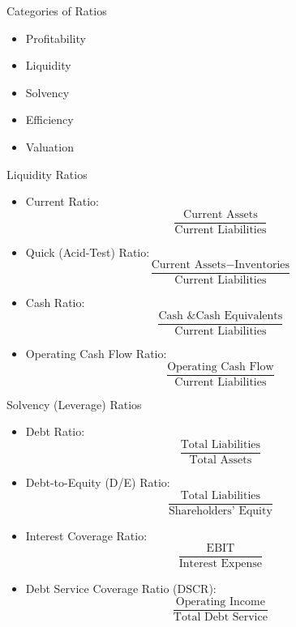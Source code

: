 \documentclass[10pt]{beamer}
\begin{document}
\begin{frame}{Categories of Ratios}
\begin{itemize}
\item Profitability
\item Liquidity
\item Solvency
\item Efficiency
\item Valuation
\end{itemize}
\end{frame}

\begin{frame}{Liquidity Ratios}
  \begin{itemize}
    \item Current Ratio: 
    \[
      \frac{\text{Current Assets}}{\text{Current Liabilities}}
    \]

    \item Quick (Acid-Test) Ratio: 
    \[
      \frac{\text{Current Assets} - \text{Inventories}}{\text{Current Liabilities}}
    \]

    \item Cash Ratio: 
    \[
      \frac{\text{Cash \& Cash Equivalents}}{\text{Current Liabilities}}
    \]

    \item Operating Cash Flow Ratio: 
    \[
      \frac{\text{Operating Cash Flow}}{\text{Current Liabilities}}
    \]
  \end{itemize}
\end{frame}

\begin{frame}{Solvency (Leverage) Ratios}
  \begin{itemize}
    \item Debt Ratio: 
    \[
      \frac{\text{Total Liabilities}}{\text{Total Assets}}
    \]

    \item Debt-to-Equity (D/E) Ratio:
    \[
      \frac{\text{Total Liabilities}}{\text{Shareholders' Equity}}
    \]

    \item Interest Coverage Ratio: 
    \[
      \frac{\text{EBIT}}{\text{Interest Expense}}
    \]

    \item Debt Service Coverage Ratio (DSCR): 
    \[
      \frac{\text{Operating Income}}{\text{Total Debt Service}}
    \]
  \end{itemize}
\end{frame}
\end{document}
